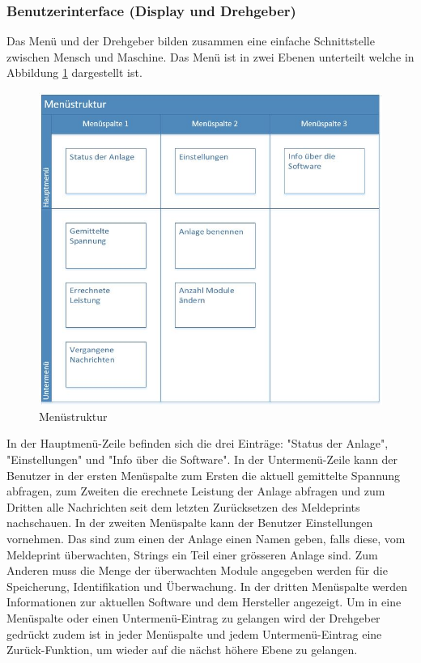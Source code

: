 \subsubsection{Benutzerinterface (Display und Drehgeber)}
Das Menü und der Drehgeber bilden zusammen eine einfache Schnittstelle zwischen Mensch und Maschine. Das Menü ist in zwei Ebenen unterteilt welche in Abbildung \ref{fig:structure-menu} dargestellt ist.

\begin{figure}[htbp] 
  \centering
     \includegraphics[width=1\textwidth]{graphics/structure-menu}
  \caption{Menüstruktur}
  \label{fig:structure-menu}
\end{figure}

In der Hauptmenü-Zeile befinden sich die drei Einträge: "Status der Anlage", "Einstellungen" und "Info über die Software". In der Untermenü-Zeile kann der Benutzer in der ersten Menüspalte zum Ersten die aktuell gemittelte Spannung abfragen, zum Zweiten die erechnete Leistung der Anlage abfragen und zum Dritten alle Nachrichten seit dem letzten Zurücksetzen des Meldeprints nachschauen. In der zweiten Menüspalte kann der Benutzer Einstellungen vornehmen. Das sind zum einen der Anlage einen Namen geben, falls diese, vom Meldeprint überwachten, Strings ein Teil einer grösseren Anlage sind. Zum Anderen muss die Menge der überwachten Module angegeben werden für die Speicherung, Identifikation und Überwachung. In der dritten Menüspalte werden Informationen zur aktuellen Software und dem Hersteller angezeigt. Um in eine Menüspalte oder einen Untermenü-Eintrag zu gelangen wird der Drehgeber gedrückt zudem ist in jeder Menüspalte und jedem Untermenü-Eintrag eine Zurück-Funktion, um wieder auf die nächst höhere Ebene zu gelangen.